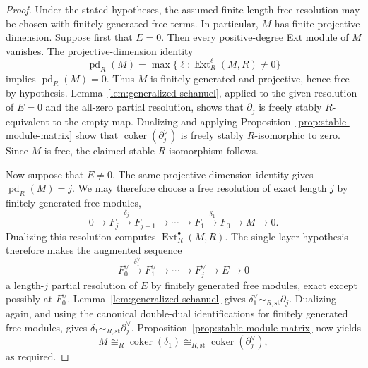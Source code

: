 \documentclass[aps,prx,english,superscriptaddress,twocolumn,tightenlines,showpacs,longbibliography,floatfix,amsfonts]{revtex4-2}
\theoremstyle{remark}
\theoremstyle{definition}
\begin{document}
\begin{proof}
	Under the stated hypotheses, the assumed finite-length free resolution
	may be chosen with finitely generated free terms. In particular, $M$
	has finite projective dimension.
	Suppose first that $E=0$. Then every positive-degree Ext module of $M$ vanishes. The projective-dimension identity
	\begin{equation}
		\operatorname{pd}_R(M)=\max\{\ell:\operatorname{Ext}_R^\ell(M,R)\neq 0\}
	\end{equation}
	implies $\operatorname{pd}_R(M)=0$. Thus $M$ is finitely generated and projective, hence free by hypothesis. Lemma~\ref{lem:generalized-schanuel}, applied to the given resolution of $E=0$ and the all-zero partial resolution, shows that $\partial_j$ is freely stably \(R\)-equivalent to the empty map. Dualizing and applying Proposition~\ref{prop:stable-module-matrix} show that $\operatorname{coker}(\partial_j^\vee)$ is freely stably \(R\)-isomorphic to zero. Since $M$ is free, the claimed stable \(R\)-isomorphism follows.

	Now suppose that $E\neq 0$. The same projective-dimension identity gives $\operatorname{pd}_R(M)=j$. We may therefore choose a free resolution of exact length $j$ by finitely generated free modules,
	\begin{equation}
		0\longrightarrow F_j\xrightarrow{\delta_j}F_{j-1}
		\longrightarrow\cdots\longrightarrow
		F_1\xrightarrow{\delta_1}F_0\longrightarrow M\longrightarrow 0.
	\end{equation}
	Dualizing this resolution computes $\operatorname{Ext}_R^\bullet(M,R)$. The single-layer hypothesis therefore makes the augmented sequence
	\begin{equation}
		F_0^\vee\xrightarrow{\delta_1^\vee}F_1^\vee
		\longrightarrow\cdots\longrightarrow
		F_j^\vee\longrightarrow E\longrightarrow 0
	\end{equation}
	a length-$j$ partial resolution of $E$ by finitely generated free
	modules, exact except possibly at $F_0^\vee$.
	Lemma~\ref{lem:generalized-schanuel} gives $\delta_1^\vee\sim_{R,\mathrm{st}}\partial_j$. Dualizing again, and using the canonical double-dual identifications for finitely generated free modules, gives $\delta_1\sim_{R,\mathrm{st}}\partial_j^\vee$. Proposition~\ref{prop:stable-module-matrix} now yields
	\begin{equation}
		M\cong_R\operatorname{coker}(\delta_1)
		\cong_{R,\mathrm{st}}\operatorname{coker}(\partial_j^\vee),
	\end{equation}
	as required.
\end{proof}
\end{document}
